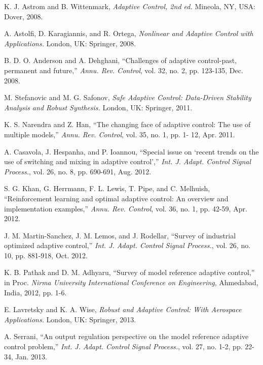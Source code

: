 \documentclass[conference]{IEEEtran}
\begin{document}
\begin{thebibliography}{99}

 K. J. Astrom and B. Wittenmark, \textit{Adaptive Control, 2nd ed.} Mineola, NY, USA: Dover, 2008.

 A. Astolfi, D. Karagiannis, and R. Ortega, \textit{Nonlinear and Adaptive Con\-trol with Applications.} London, UK: Springer, 2008.

 B. D. O. Anderson and A. Dehghani, ``Challenges of adaptive control-past, permanent and future,'' \textit{Annu. Rev. Control}, vol. 32, no. 2, pp. 123-135, Dec. 2008.

 M. Stefanovic and M. G. Safonov, \textit{Safe Adaptive Control: Data-Driven Stability Analysis and Robust Synthesis.} London, UK: Springer, 2011.

 K. S. Narendra and Z. Han, ``The changing face of adaptive control: The use of multiple models,'' \textit{Annu. Rev. Control}, vol. 35, no. 1, pp. 1- 12, Apr. 2011.

 A. Casavola, J. Hespanha, and P. Ioannou, ``Special issue on `recent trends on the use of switching and mixing in adaptive control','' \textit{Int. J. Adapt. Control Signal Process.}, vol. 26, no. 8, pp. 690-691, Aug. 2012.

 S. G. Khan, G. Herrmann, F. L. Lewis, T. Pipe, and C. Melhuish, ``Reinforcement learning and optimal adaptive control: An overview and implementation examples,'' \textit{Annu. Rev. Control}, vol. 36, no. 1, pp. 42-59, Apr. 2012.

 J. M. Martin-Sanchez, J. M. Lemos, and J. Rodellar, ``Survey of indus\-trial optimized adaptive control,'' \textit{Int. J. Adapt. Control Signal Process.}, vol. 26, no. 10, pp. 881-918, Oct. 2012.

 K. B. Pathak and D. M. Adhyaru, ``Survey of model reference adaptive control,'' in Proc. \textit{Nirma University International Conference on Engineering}, Ahmedabad, India, 2012, pp. 1-6.

 E. Lavretsky and K. A. Wise, \textit{Robust and Adaptive Control: With Ae\-rospace Applications.} London, UK: Springer, 2013.

 A. Serrani, ``An output regulation perspective on the model reference adaptive control problem,'' \textit{Int. J. Adapt. Control Signal Process.}, vol. 27, no. 1-2, pp. 22-34, Jan. 2013.


\end{thebibliography}
\end{document}
